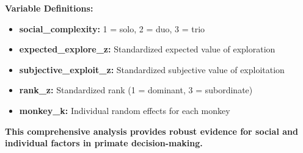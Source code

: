 \documentclass[11pt]{article}
\begin{document}
\textbf{Variable Definitions:}
\begin{itemize}
    \item \textbf{social\_complexity:} 1 = solo, 2 = duo, 3 = trio
    \item \textbf{expected\_explore\_z:} Standardized expected value of exploration
    \item \textbf{subjective\_exploit\_z:} Standardized subjective value of exploitation
    \item \textbf{rank\_z:} Standardized rank (1 = dominant, 3 = subordinate)
    \item \textbf{monkey\_k:} Individual random effects for each monkey
\end{itemize}

\vspace{1cm}

\textbf{This comprehensive analysis provides robust evidence for social and individual factors in primate decision-making.}
\end{document}
